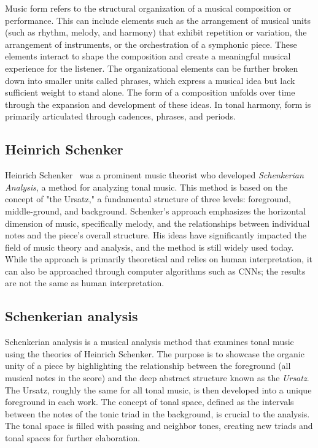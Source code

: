 Music form refers to the structural organization of a musical composition or performance. This can include elements such as the arrangement of musical units (such as rhythm, melody, and harmony) that exhibit repetition or variation, the arrangement of instruments, or the orchestration of a symphonic piece. These elements interact to shape the composition and create a meaningful musical experience for the listener. The organizational elements can be further broken down into smaller units called phrases, which express a musical idea but lack sufficient weight to stand alone. The form of a composition unfolds over time through the expansion and development of these ideas. In tonal harmony, form is primarily articulated through cadences, phrases, and periods. 

\subsection{Heinrich Schenker}

Heinrich Schenker~\cite{schenkerdocumentsonline} was a prominent music theorist who developed \textit{Schenkerian Analysis}, a method for analyzing tonal music. This method is based on the concept of "the Ursatz," a fundamental structure of three levels: foreground, middle-ground, and background. Schenker's approach emphasizes the horizontal dimension of music, specifically melody, and the relationships between individual notes and the piece's overall structure. His ideas have significantly impacted the field of music theory and analysis, and the method is still widely used today. While the approach is primarily theoretical and relies on human interpretation, it can also be approached through computer algorithms such as CNNs; the results are not the same as human interpretation.

\subsection{Schenkerian analysis}

Schenkerian analysis is a musical analysis method that examines tonal music using the theories of Heinrich Schenker. The purpose is to showcase the organic unity of a piece by highlighting the relationship between the foreground (all musical notes in the score) and the deep abstract structure known as the \textit{Ursatz}. The Ursatz, roughly the same for all tonal music, is then developed into a unique foreground in each work. The concept of tonal space, defined as the intervals between the notes of the tonic triad in the background, is crucial to the analysis. The tonal space is filled with passing and neighbor tones, creating new triads and tonal spaces for further elaboration.

